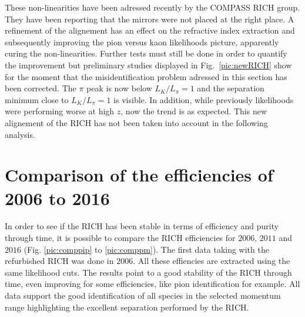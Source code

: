 These non-linearities have been adressed recently by the COMPASS RICH group. They have been reporting that the mirrors were not placed at the right place. A refinement of the alignement has an effect on the refractive index extraction and subsequently improving the pion versus kaon likelihoods picture, apparently curing the non-linearities. Further tests must still be done in order to quantify the improvement but preliminary studies \cite{MarcinNew} displayed in Fig.~\ref{pic:newRICH} show for the moment that the misidentification problem adressed in this section has been corrected. The $\pi$ peak is now below $L_{K}/L_{\pi} = 1$ and the separation minimum close to $L_{K}/L_{\pi} = 1$ is visible. In addition, while previously likelihoods were performing worse at high $z$, now the trend is as expected. This new alignement of the RICH has not been taken into account in the following analysis.

\section{Comparison of the efficiencies of 2006 to 2016}

In order to see if the RICH has been stable in terms of efficiency and purity through time, it is possible to compare the RICH efficiencies for $2006$, $2011$ and $2016$ (Fig. \ref{pic:comppip} to \ref{pic:comppm}). The first data taking with the refurbished RICH was done in $2006$. All these effiencies are extracted using the same likelihood cuts. The results point to a good stability of the RICH through time, even improving for some efficiencies, like pion identification for example. All data support the good identification of all species in the selected momentum range highlighting the excellent separation performed by the RICH.

